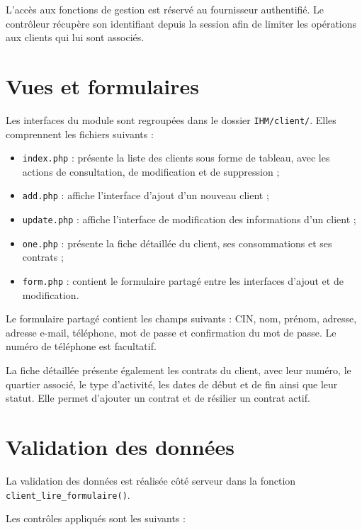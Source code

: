 L'accès aux fonctions de gestion est réservé au fournisseur authentifié. Le contrôleur récupère son identifiant depuis la session afin de limiter les opérations aux clients qui lui sont associés.

\section{Vues et formulaires}

Les interfaces du module sont regroupées dans le dossier \texttt{IHM/client/}. Elles comprennent les fichiers suivants :

\begin{itemize}[leftmargin=*]
    \item \texttt{index.php} : présente la liste des clients sous forme de tableau, avec les actions de consultation, de modification et de suppression ;
    \item \texttt{add.php} : affiche l'interface d'ajout d'un nouveau client ;
    \item \texttt{update.php} : affiche l'interface de modification des informations d'un client ;
    \item \texttt{one.php} : présente la fiche détaillée du client, ses consommations et ses contrats ;
    \item \texttt{form.php} : contient le formulaire partagé entre les interfaces d'ajout et de modification.
\end{itemize}

Le formulaire partagé contient les champs suivants : CIN, nom, prénom, adresse, adresse e-mail, téléphone, mot de passe et confirmation du mot de passe. Le numéro de téléphone est facultatif.

La fiche détaillée présente également les contrats du client, avec leur numéro, le quartier associé, le type d'activité, les dates de début et de fin ainsi que leur statut. Elle permet d'ajouter un contrat et de résilier un contrat actif.

\section{Validation des données}

La validation des données est réalisée côté serveur dans la fonction \texttt{client\_lire\_formulaire()}.

Les contrôles appliqués sont les suivants :

